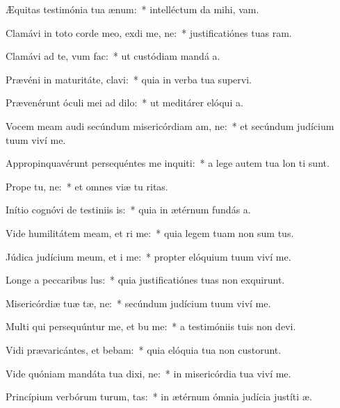 \item Æquitas testimónia tua  ænum:~* intelléctum da mihi,  vam.
\item Clamávi in toto corde meo, exdi me, ne:~* justificatiónes tuas ram.
\item Clamávi ad te, vum  fac:~* ut custódiam mandá a.
\item Prævéni in maturitáte,  clavi:~* quia in verba tua supervi.
\item Prævenérunt óculi mei ad  dilo:~* ut meditárer elóqui a.
\item Vocem meam audi secúndum misericórdiam am, ne:~* et secúndum judícium tuum viví me.
\item Appropinquavérunt persequéntes me inquiti:~* a lege autem tua lon ti sunt.
\item Prope  tu, ne:~* et omnes viæ tu ritas.
\item Inítio cognóvi de testiniis is:~* quia in ætérnum fundás a.
\item Vide humilitátem meam, et ri me:~* quia legem tuam non sum tus.
\item Júdica judícium meum, et i me:~* propter elóquium tuum viví me.
\item Longe a peccaribus lus:~* quia justificatiónes tuas non exquirunt.
\item Misericórdiæ tuæ tæ, ne:~* secúndum judícium tuum viví me.
\item Multi qui persequúntur me, et bu me:~* a testimóniis tuis non devi.
\item Vidi prævaricántes, et bebam:~* quia elóquia tua non custorunt.
\item Vide quóniam mandáta tua dixi, ne:~* in misericórdia tua viví me.
\item Princípium verbórum turum, tas:~* in ætérnum ómnia judícia justíti æ.

